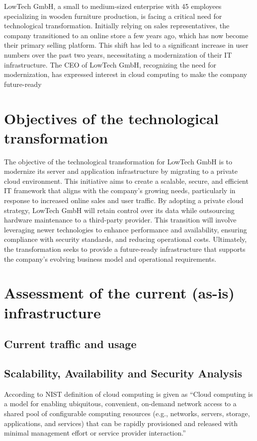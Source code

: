 \documentclass{llncs}
\begin{document}
LowTech GmbH, a small to medium-sized enterprise with 45 employees specializing in wooden furniture production, is facing a critical need for technological transformation. 
Initially relying on sales representatives, the company transitioned to an online store a few years ago, which has now become their primary selling platform. 
This shift has led to a significant increase in user numbers over the past two years, necessitating a modernization of their IT infrastructure. 
The CEO of LowTech GmbH, recognizing the need for modernization, has expressed interest in cloud computing to make the company future-ready

\section{Objectives of the technological transformation}

The objective of the technological transformation for LowTech GmbH is to modernize its server and application infrastructure by migrating to a private cloud environment. 
This initiative aims to create a scalable, secure, and efficient IT framework that aligns with the company's growing needs, particularly in response to increased online sales and user traffic. 
By adopting a private cloud strategy, LowTech GmbH will retain control over its data while outsourcing hardware maintenance to a third-party provider. 
This transition will involve leveraging newer technologies to enhance performance and availability, ensuring compliance with security standards, and reducing operational costs. 
Ultimately, the transformation seeks to provide a future-ready infrastructure that supports the company's evolving business model and operational requirements.

\section{Assessment of the current (as-is) infrastructure}

\subsection{Current traffic and usage}

\subsection{Scalability, Availability and Security Analysis}
According to NIST definition of cloud computing is given as ``Cloud computing is a model for enabling ubiquitous, convenient, on-demand network access to a shared
pool of configurable computing resources (e.g., networks, servers, storage, applications, and services) that
can be rapidly provisioned and released with minimal management effort or service provider interaction.'' \cite{mell2011nist}
\end{document}
